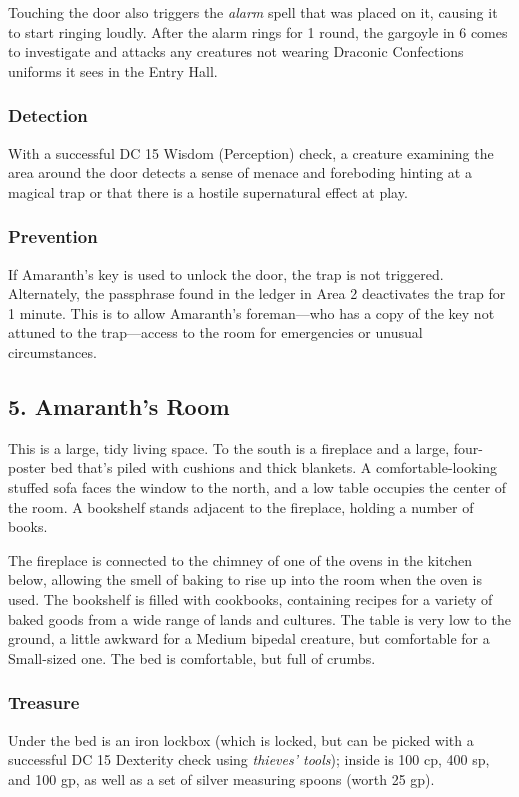 \documentclass[10pt,a4paper,twoside,bg=print,twocolumn,openany,nodeprecatedcode]{dndbook}
\begin{document}
Touching the door also triggers the \textit{alarm} spell that was placed on it, causing it to start ringing loudly. After the alarm rings for 1 round, the gargoyle in 6 comes to investigate and attacks any creatures not wearing Draconic Confections uniforms it sees in the Entry Hall.

\subsubsection{Detection}
With a successful DC 15 Wisdom (Perception) check, a creature examining the area around the door detects a sense of menace and foreboding hinting at a magical trap or that there is a hostile supernatural effect at play.

\subsubsection{Prevention}
If Amaranth's key is used to unlock the door, the trap is not triggered. Alternately, the passphrase found in the ledger in Area 2 deactivates the trap for 1 minute. This is to allow Amaranth's foreman—who has a copy of the key not attuned to the trap—access to the room for emergencies or unusual circumstances.

\subsection{5. Amaranth's Room}
\begin{DndReadAloud}{}
This is a large, tidy living space. To the south is a fireplace and a large, four-poster bed that's piled with cushions and thick blankets. A comfortable-looking stuffed sofa faces the window to the north, and a low table occupies the center of the room. A bookshelf stands adjacent to the fireplace, holding a number of books.

\end{DndReadAloud}

The fireplace is connected to the chimney of one of the ovens in the kitchen below, allowing the smell of baking to rise up into the room when the oven is used. The bookshelf is filled with cookbooks, containing recipes for a variety of baked goods from a wide range of lands and cultures. The table is very low to the ground, a little awkward for a Medium bipedal creature, but comfortable for a Small-sized one. The bed is comfortable, but full of crumbs.

\subsubsection{Treasure}
Under the bed is an iron lockbox (which is locked, but can be picked with a successful DC 15 Dexterity check using \textit{thieves' tools}); inside is 100 cp, 400 sp, and 100 gp, as well as a set of silver measuring spoons (worth 25 gp).
\end{document}
